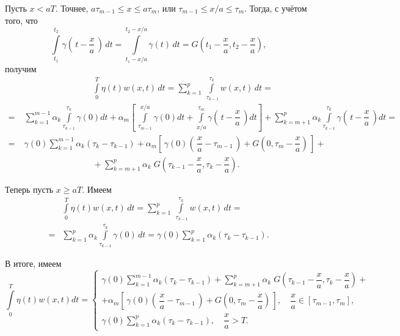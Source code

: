 \documentclass{article}
\renewcommand{\le}{\leqslant}
\renewcommand{\ge}{\geqslant}
\theoremstyle{definition}
\begin{document}
Пусть $x < aT$. Точнее, $a\tau_{m - 1} \le x \le a\tau_m$, или $\tau_{m - 1} \le x / a \le \tau_m$. Тогда, с учётом того, что
\begin{equation*}
	\int\limits_{t_1}^{t_2} \gamma\left(\,t - \dfrac{x}{a}\,\right) \,dt = \int\limits_{t_1 - x/a}^{t_2 - x/a} \gamma(t) \,dt = 
	G\left(t_1 - \dfrac{x}{a}, t_2 - \dfrac{x}{a}\right),
\end{equation*}
получим
\begin{equation*} \label{int_eta_w_x<aT}
\begin{aligned}
	& \phantom{--------} \int\limits_0^T \eta(t)w(x,t) \,dt = 
	\sum\limits_{k = 1}^p \int\limits_{\;\tau_{k - 1}}^{\tau_k} w(x,t) \,dt = \\[2mm]
	= & \sum\limits_{k = 1}^{m - 1} \alpha_k \!\!\int\limits_{\tau_{k - 1}}^{\tau_k}\!\! \gamma(0) dt +
	\alpha_m \!\!\left[\, \int\limits_{\tau_{m - 1}}^{x/a}\!\!\! \gamma(0) dt +\!\!
	\int\limits_{x/a}^{\tau_m}\!\! \gamma\!\left(\,t - \dfrac{x}{a}\,\right) dt \right] \!\!+\!
	\sum\limits_{k = m + 1}^{p}\! \alpha_k \!\!\int\limits_{\tau_{k - 1}}^{\tau_k}\!\! \gamma \!\left(\,t - \dfrac{x}{a}\,\right)\! dt = \\[2mm]
	=\; & \gamma(0)\sum\limits_{k = 1}^{m - 1} \alpha_k(\tau_k - \tau_{k - 1}) + 
	\alpha_m \left[\, \gamma(0)\left(\, \dfrac{x}{a} - \tau_{m - 1} \,\right) + 
	G\left(0, \tau_{m} - \dfrac{x}{a}\right) \,\right] + \\[2mm]
	& \phantom{--------} + \sum\limits_{k = m + 1}^{p} \alpha_k \;G\left(\tau_{k - 1} - \dfrac{x}{a}, \tau_{k} - \dfrac{x}{a}\right).
\end{aligned}
\end{equation*}

Теперь пусть $x \ge aT$. Имеем
\begin{equation*} \label{int_eta_w_x>aT}
\begin{aligned}
	& \int\limits_0^T \eta(t)w(x,t) \,dt = \sum\limits_{k = 1}^p \int\limits_{\;\tau_{k - 1}}^{\tau_k} w(x,t) \,dt = \\[2mm]
	= & \sum\limits_{k = 1}^{p} \alpha_k \int\limits_{\tau_{k - 1}}^{\tau_k} \gamma(0) \,dt = 
	\gamma(0)\sum\limits_{k = 1}^{p} \alpha_k(\tau_k - \tau_{k - 1}).
\end{aligned}	
\end{equation*}

В итоге, имеем
\begin{equation} \label{int_eta_w_def}
\int\limits_0^T \!\eta(t)w(x,t) dt =
	\begin{cases}
		\gamma(0)\sum\limits_{k = 1}^{m - 1} \alpha_k(\tau_k - \tau_{k - 1}) + 
		\sum\limits_{k = m + 1}^{p} \alpha_k \;G\left(\tau_{k - 1} - \dfrac{x}{a}, \tau_{k} - \dfrac{x}{a}\right) + \\[7mm]
		+ \alpha_m \!\!\left[\, \gamma(0)\!\left(\, \dfrac{x}{a} - \tau_{m - 1} \,\right) + 
		G\!\left(0, \tau_{m} - \dfrac{x}{a}\right) \,\right]\!, \quad \dfrac{x}{a} \in [\tau_{m - 1}, \tau_m], \\[5mm]
		\gamma(0)\sum\limits_{k = 1}^{p} \alpha_k(\tau_k - \tau_{k - 1}), \quad \dfrac{x}{a} > T.
	\end{cases}
\end{equation} \\
\end{document}
